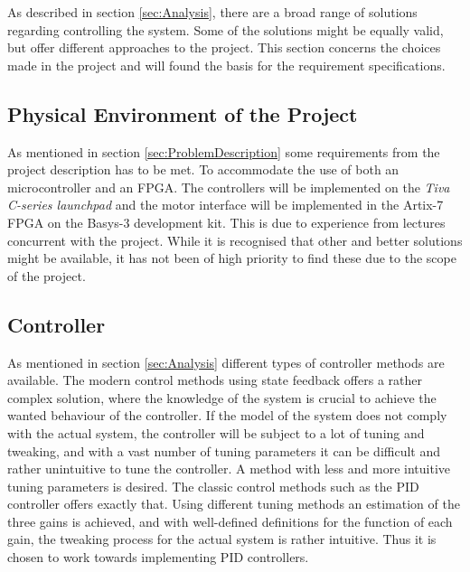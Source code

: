 \documentclass[../../main.tex]{subfiles}
\begin{document}
As described in section \ref{sec:Analysis}, there are a broad range of solutions regarding controlling the system. Some of the solutions might be equally valid, but offer different approaches to the project. This section concerns the choices made in the project and will found the basis for the requirement specifications.

\subsection*{Physical Environment of the Project}
As mentioned in section \ref{sec:ProblemDescription} some requirements from the project description has to be met. To accommodate the use of both an microcontroller and an FPGA. The controllers will be implemented on the \textit{Tiva C-series launchpad} and the motor interface will be implemented in the Artix-7 FPGA on the Basys-3 development kit. This is due to experience from lectures concurrent with the project. While it is recognised that other and better solutions might be available, it has not been of high priority to find these due to the scope of the project. 



\subsection*{Controller}
As mentioned in section \ref{sec:Analysis} different types of controller methods are available. The modern control methods using state feedback offers a rather complex solution, where the knowledge of the system is crucial to achieve the wanted behaviour of the controller. If the model of the system does not comply with the actual system, the controller will be subject to a lot of tuning and tweaking, and with a vast number of tuning parameters it can be difficult and rather unintuitive to tune the controller. A method with less and more intuitive tuning parameters is desired. The classic control methods such as the PID controller offers exactly that. Using different tuning methods an estimation of the three gains is achieved, and with well-defined definitions for the function of each gain, the tweaking process for the actual system is rather intuitive. Thus it is chosen to work towards implementing PID controllers.
\end{document}
